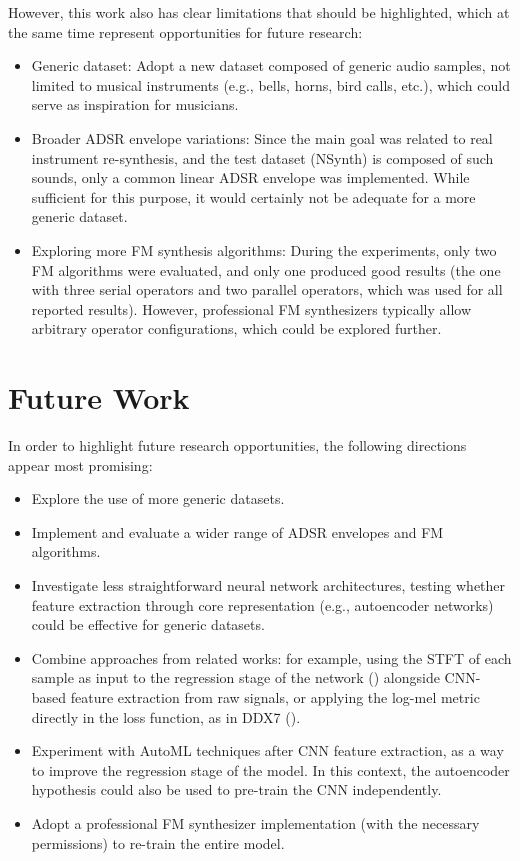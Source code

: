 \documentclass[sigconf,natbib=false]{acmart}
\begin{document}
However, this work also has clear limitations that should be highlighted, which at the same time represent opportunities for future research:
\begin{itemize}
\item Generic dataset: Adopt a new dataset composed of generic audio samples, not limited to musical instruments (e.g., bells, horns, bird calls, etc.), which could serve as inspiration for musicians.
\item Broader ADSR envelope variations: Since the main goal was related to real instrument re-synthesis, and the test dataset (NSynth) is composed of such sounds, only a common linear ADSR envelope was implemented. While sufficient for this purpose, it would certainly not be adequate for a more generic dataset.
\item Exploring more FM synthesis algorithms: During the experiments, only two FM algorithms were evaluated, and only one produced good results (the one with three serial operators and two parallel operators, which was used for all reported results). However, professional FM synthesizers typically allow arbitrary operator configurations, which could be explored further.
\end{itemize}

\section{Future Work}

In order to highlight future research opportunities, the following directions appear most promising:

\begin{itemize}
\item Explore the use of more generic datasets.
\item Implement and evaluate a wider range of ADSR envelopes and FM algorithms.
\item Investigate less straightforward neural network architectures, testing whether feature extraction through core representation (e.g., autoencoder networks) could be effective for generic datasets.
\item Combine approaches from related works: for example, using the STFT of each sample as input to the regression stage of the network (\textcite{claesson2021resynthesis}) alongside CNN-based feature extraction from raw signals, or applying the log-mel metric directly in the loss function, as in DDX7 (\textcite{steinmetz2022ddx7}).
\item Experiment with AutoML techniques after CNN feature extraction, as a way to improve the regression stage of the model. In this context, the autoencoder hypothesis could also be used to pre-train the CNN independently.
\item Adopt a professional FM synthesizer implementation (with the necessary permissions) to re-train the entire model.
\end{itemize}
\end{document}

